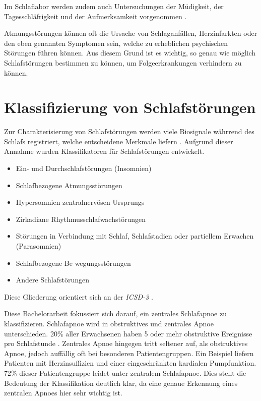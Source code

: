 Im Schlaflabor werden zudem auch Untersuchungen der Müdigkeit, der Tagesschläfrigkeit und der Aufmerksamkeit vorgenommen \cite{schlafmedizin_1x1}.

Atmungsstörungen können oft die Ursache von Schlaganfällen, Herzinfarkten oder den eben genannten Symptomen sein, welche zu erheblichen psychischen Störungen führen können.
Aus diesem Grund ist es wichtig, so genau wie möglich Schlafstörungen bestimmen zu können, um Folgeerkrankungen verhindern zu können. 

\section{Klassifizierung von Schlafstörungen}
Zur Charakterisierung von Schlafstörungen werden viele Biosignale währrend des Schlafs registriert, welche entscheidene Merkmale liefern \cite{praxis_der_schlafmedizin}.
Aufgrund dieser Annahme wurden Klassifikatoren für Schlafstörungen entwickelt.
\begin{itemize}
    \item Ein- und Durchschlafstörungen (Insomnien)
    \item Schlafbezogene Atmungsstörungen
    \item Hypersomnien zentralnervösen Ursprungs
    \item Zirkadiane Rhythmusschlafwachstörungen
    \item Störungen in Verbindung mit Schlaf, Schlafstadien oder partiellem Erwachen (Parasomnien)
    \item Schlafbezogene Be wegungsstörungen
    \item Andere Schlafstörungen
\end{itemize}

Diese Gliederung orientiert sich an der \textit{ICSD-3} \cite{praxis_der_schlafmedizin}.


Diese Bachelorarbeit fokussiert sich darauf, ein zentrales Schlafapnoe zu klassifizieren. 
Schlafapnoe wird in obstruktives und zentrales Apnoe unterschieden. 
20\% aller Erwachsenen haben 5 oder mehr obstruktive Ereignisse pro Schlafstunde \cite{schlafmedizin_1x1}.
Zentrales Apnoe hingegen tritt seltener auf, als obstruktives Apnoe, jedoch auffällig oft bei besonderen Patientengruppen. 
Ein Beispiel liefern Patienten mit Herzinsuffizien und einer eingeschränkten kardialen Pumpfunktion.
72\% dieser Patientengruppe leidet unter zentralem Schlafapnoe. Dies stellt die Bedeutung der Klassifikation deutlich klar, da eine genaue Erkennung eines zentralen Apnoes hier sehr wichtig ist.

